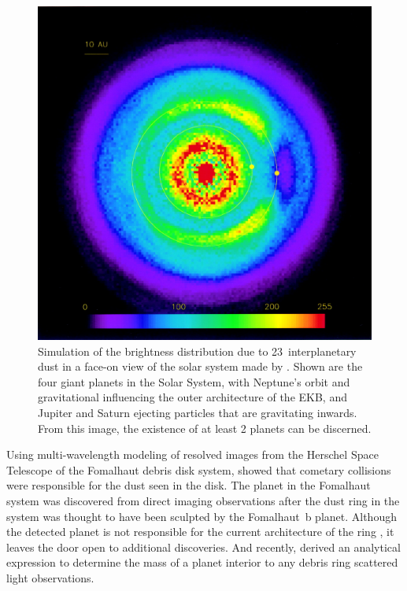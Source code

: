     \begin{figure}
    \centering
    \includegraphics[width=\textwidth]{Ch1/LiouZook_SS_99}
    \caption[Giant planets imprinted on solar system disk simulation]{Simulation of the brightness distribution due to 23\micron\ interplanetary dust in a face-on view of the solar system made by \citet{Liou1999}. Shown are the four giant planets in the Solar System, with Neptune's orbit and gravitational influencing the outer architecture of the EKB, and Jupiter and Saturn ejecting particles that are gravitating inwards. From this image, the existence of at least 2 planets can be discerned.}
    \label{fig:LiouZook_faceon}
    \end{figure}


    Using multi-wavelength modeling of resolved images from the Herschel Space Telescope of the Fomalhaut debris disk system, \citet{Acke2012} showed that cometary collisions were responsible for the dust seen in the disk. The planet in the Fomalhaut system \citep{Kalas2008} was discovered from direct imaging observations after the dust ring in the system was thought to have been sculpted by the Fomalhaut~b planet. Although the detected planet is not responsible for the current architecture of the ring \citep{Kalas2013}, it leaves the door open to additional discoveries. And recently, \citet{Rodigas2014} derived an analytical expression to determine the mass of a planet interior to any debris ring scattered light observations. 
    
